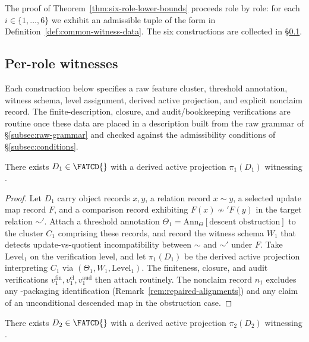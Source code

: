 The proof of Theorem~\ref{thm:six-role-lower-bounds} proceeds role by
role: for each \(i \in \{1,\ldots,6\}\) we exhibit an admissible
tuple of the form in Definition~\ref{def:common-witness-data}. The
six constructions are collected in
\S\ref{subsec:per-role-witnesses}.

\subsection{Per-role witnesses}\label{subsec:per-role-witnesses}

Each construction below specifies a raw feature cluster, threshold
annotation, witness schema, level assignment, derived active
projection, and explicit nonclaim record. The finite-description,
closure, and audit/bookkeeping verifications are routine once these
data are placed in a description built from the raw grammar of
\S\ref{subsec:raw-grammar} and checked against the admissibility
conditions of \S\ref{subsec:conditions}.

\begin{proposition}\label{prop:p1-witness}
There exists \(D_1 \in \FATCD{}\) with a derived active projection
\(\pi_1(D_1)\) witnessing \Pone{}.
\end{proposition}

\begin{proof}
Let \(D_1\) carry object records \(x, y\), a relation record
\(x \sim y\), a selected update map record \(F\), and a comparison
record exhibiting \(F(x) \not\sim' F(y)\) in the target relation
\(\sim'\). Attach a threshold annotation
\(\Theta_1 = \mathrm{Ann}_\Theta[\text{descent obstruction}]\) to the
cluster \(C_1\) comprising these records, and record the witness schema
\(W_1\) that detects update-vs-quotient incompatibility between \(\sim\)
and \(\sim'\) under \(F\). Take \(\mathrm{Level}_1\) on the verification
level, and let \(\pi_1(D_1)\) be the derived active projection
interpreting \(C_1\) via \((\Theta_1,W_1,\mathrm{Level}_1)\). The
finiteness, closure, and audit verifications \(v_1^{\mathrm{fin}},
v_1^{\mathrm{cl}}, v_1^{\mathrm{aud}}\) then attach routinely. The
nonclaim record \(n_1\) excludes any \Pfive{}-packaging
identification (Remark~\ref{rem:repaired-alignments}) and any claim of
an unconditional descended map in the obstruction case.
\end{proof}

\begin{proposition}\label{prop:p2-witness}
There exists \(D_2 \in \FATCD{}\) with a derived active projection
\(\pi_2(D_2)\) witnessing \Ptwo{}.
\end{proposition}

